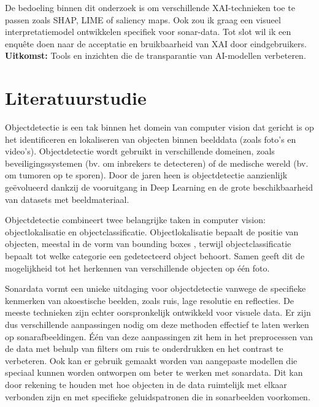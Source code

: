 De bedoeling binnen dit onderzoek is om verschillende XAI-technieken toe te passen zoals SHAP, LIME of saliency maps. Ook zou ik graag een visueel interpretatiemodel ontwikkelen specifiek voor sonar-data. Tot slot wil ik een enquête doen naar de acceptatie en bruikbaarheid van XAI door eindgebruikers. \\

\textbf{Uitkomst:} Tools en inzichten die de transparantie van AI-modellen verbeteren.


\section{Literatuurstudie}%
\label{sec:literatuurstudie}

Objectdetectie is een tak binnen het domein van computer vision dat gericht is op het identificeren en lokaliseren van objecten binnen beelddata (zoals foto's en video's). Objectdetectie wordt gebruikt in verschillende domeinen, zoals beveiligingssystemen (bv. om inbrekers te detecteren) of de medische wereld (bv. om tumoren op te sporen). Door de jaren heen is objectdetectie aanzienlijk geëvolueerd dankzij de vooruitgang in Deep Learning en de grote beschikbaarheid van datasets met beeldmateriaal. \autocite{He_2016}

Objectdetectie combineert twee belangrijke taken in computer vision: objectlokalisatie en objectclassificatie. Objectlokalisatie bepaalt de positie van objecten, meestal in de vorm van bounding boxes \autocite{Tompson_2015}, terwijl objectclassificatie bepaalt tot welke categorie een gedetecteerd object behoort. Samen geeft dit de mogelijkheid tot het herkennen van verschillende objecten op één foto.

Sonardata vormt een unieke uitdaging voor objectdetectie vanwege de specifieke kenmerken van akoestische beelden, zoals ruis, lage resolutie en reflecties. De meeste technieken zijn echter oorspronkelijk ontwikkeld voor visuele data. Er zijn dus verschillende aanpassingen nodig om deze methoden effectief te laten werken op sonarafbeeldingen. Één van deze aanpassingen zit hem in het preprocessen van de data met behulp van filters om ruis te onderdrukken en het contrast te verbeteren. Ook kan er gebruik gemaakt worden van aangepaste modellen die speciaal kunnen worden ontworpen om beter te werken met sonardata. Dit kan door rekening te houden met hoe objecten in de data ruimtelijk met elkaar verbonden zijn en met specifieke geluidspatronen die in sonarbeelden voorkomen. \autocite{Karimanzira_2020}

